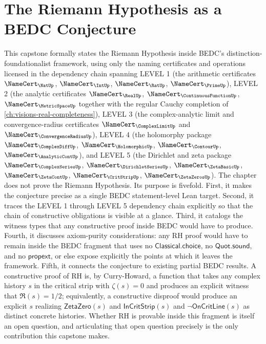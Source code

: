 \chapter{The Riemann Hypothesis as a BEDC Conjecture}
\label{ch:visions-riemann-hypothesis}

This capstone formally states the Riemann Hypothesis inside BEDC's distinction-foundationalist framework, using only the naming certificates and operations licensed in the dependency chain spanning LEVEL 1 (the arithmetic certificates $\NameCert_{\NatUp}$, $\NameCert_{\IntUp}$, $\NameCert_{\RatUp}$, $\NameCert_{\PrimeUp}$), LEVEL 2 (the analytic certificates $\NameCert_{\RealUp}$, $\NameCert_{\ContinuousFunctionUp}$, $\NameCert_{\MetricSpaceUp}$ together with the regular Cauchy completion of \autoref{ch:visions-real-completeness}), LEVEL 3 (the complex-analytic limit and convergence-radius certificates $\NameCert_{\ComplexLimitUp}$ and $\NameCert_{\ConvergenceRadiusUp}$), LEVEL 4 (the holomorphy package $\NameCert_{\ComplexDiffUp}$, $\NameCert_{\HolomorphicUp}$, $\NameCert_{\ContourUp}$, $\NameCert_{\AnalyticContUp}$), and LEVEL 5 (the Dirichlet and zeta package $\NameCert_{\ComplexSeriesUp}$, $\NameCert_{\DirichletSeriesUp}$, $\NameCert_{\ZetaBasicUp}$, $\NameCert_{\ZetaContUp}$, $\NameCert_{\CritStripUp}$, $\NameCert_{\ZetaZerosUp}$). The chapter does not prove the Riemann Hypothesis. Its purpose is fivefold. First, it makes the conjecture precise as a single BEDC statement-level Lean target. Second, it traces the LEVEL 1 through LEVEL 5 dependency chain explicitly so that the chain of constructive obligations is visible at a glance. Third, it catalogs the witness types that any constructive proof inside BEDC would have to produce. Fourth, it discusses axiom-purity considerations: any RH proof would have to remain inside the BEDC fragment that uses no $\mathsf{Classical.choice}$, no $\mathsf{Quot.sound}$, and no $\mathsf{propext}$, or else expose explicitly the points at which it leaves the framework. Fifth, it connects the conjecture to existing partial BEDC results. A constructive proof of RH is, by Curry-Howard, a function that takes any complex history $s$ in the critical strip with $\zeta(s) = 0$ and produces an explicit witness that $\Re(s) = 1/2$; equivalently, a constructive disproof would produce an explicit $s$ realizing $\mathsf{ZetaZero}(s)$ and $\mathsf{InCritStrip}(s)$ and $\neg\mathsf{OnCritLine}(s)$ as distinct concrete histories. Whether RH is provable inside this fragment is itself an open question, and articulating that open question precisely is the only contribution this capstone makes.


